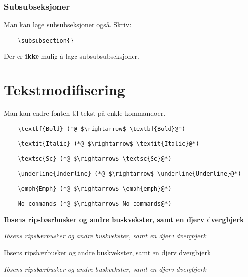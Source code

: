 \documentclass[11pt]{article}
\begin{document}
\subsubsection{Subsubseksjoner}
Man kan lage subsubseksjoner også. Skriv: 
\begin{lstlisting}
	\subsubsection{}
\end{lstlisting}
Der er \textbf{ikke} mulig å lage subsubsubseksjoner.


\section{Tekstmodifisering}
Man kan endre fonten til tekst på enkle kommandoer.\newline{}
\begin{lstlisting}
	\textbf{Bold} (*@ $\rightarrow$ \textbf{Bold}@*) 
\end{lstlisting}
\begin{lstlisting}
	\textit{Italic} (*@ $\rightarrow$ \textit{Italic}@*) 
\end{lstlisting}
\begin{lstlisting}
	\textsc{Sc} (*@ $\rightarrow$ \textsc{Sc}@*) 
\end{lstlisting}
\begin{lstlisting}
	\underline{Underline} (*@ $\rightarrow$ \underline{Underline}@*) 
\end{lstlisting}
\begin{lstlisting}
	\emph{Emph} (*@ $\rightarrow$ \emph{emph}@*) 
\end{lstlisting}
\begin{lstlisting}
	No commands (*@ $\rightarrow$ No commands@*) 
\end{lstlisting}

\textbf{Ibsens ripsbærbusker og andre buskvekster, samt en djerv dvergbjerk}

\textit{Ibsens ripsbærbusker og andre buskvekster, samt en djerv dvergbjerk}

\underline{Ibsens ripsbærbusker og andre buskvekster, samt en djerv dvergbjerk}

\emph{Ibsens ripsbærbusker og andre buskvekster, samt en djerv dvergbjerk}


\end{document}
